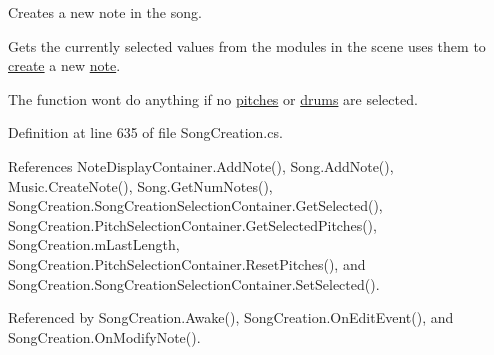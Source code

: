 Creates a new note in the song. 

Gets the currently selected values from the modules in the scene uses them to \hyperlink{group___music_stat_func_gaaf74885e43eb623f64f961985fadcd08}{create} a new \hyperlink{group___music_structs_struct_music_1_1_combined_note}{note}.

The function won\textquotesingle{}t do anything if no \hyperlink{group___s_c_priv_var_gac32e68713b2b504807f52acef445df1c}{pitches} or \hyperlink{group___s_c_priv_var_ga3f1c71d8cabe505745220d728c6f97bc}{drums} are selected. 

Definition at line 635 of file Song\+Creation.\+cs.



References Note\+Display\+Container.\+Add\+Note(), Song.\+Add\+Note(), Music.\+Create\+Note(), Song.\+Get\+Num\+Notes(), Song\+Creation.\+Song\+Creation\+Selection\+Container.\+Get\+Selected(), Song\+Creation.\+Pitch\+Selection\+Container.\+Get\+Selected\+Pitches(), Song\+Creation.\+m\+Last\+Length, Song\+Creation.\+Pitch\+Selection\+Container.\+Reset\+Pitches(), and Song\+Creation.\+Song\+Creation\+Selection\+Container.\+Set\+Selected().



Referenced by Song\+Creation.\+Awake(), Song\+Creation.\+On\+Edit\+Event(), and Song\+Creation.\+On\+Modify\+Note().


